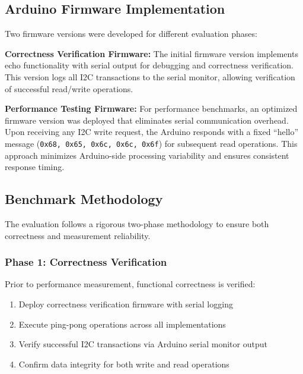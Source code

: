 
\subsection{Arduino Firmware Implementation}
\label{subsec:arduino-firmware}

Two firmware versions were developed for different evaluation phases:

\textbf{Correctness Verification Firmware:}
The initial firmware version implements echo functionality with serial output for debugging and correctness verification. This version logs all I2C transactions to the serial monitor, allowing verification of successful read/write operations.

\textbf{Performance Testing Firmware:}
For performance benchmarks, an optimized firmware version was deployed that eliminates serial communication overhead. Upon receiving any I2C write request, the Arduino responds with a fixed ``hello'' message (\texttt{0x68, 0x65, 0x6c, 0x6c, 0x6f}) for subsequent read operations. This approach minimizes Arduino-side processing variability and ensures consistent response timing.

\subsection{Benchmark Methodology}
\label{subsec:benchmark-methodology}

The evaluation follows a rigorous two-phase methodology to ensure both correctness and measurement reliability.

\subsubsection{Phase 1: Correctness Verification}
\label{subsubsec:correctness-verification}

Prior to performance measurement, functional correctness is verified:
\begin{enumerate}
    \item Deploy correctness verification firmware with serial logging
    \item Execute ping-pong operations across all implementations
    \item Verify successful I2C transactions via Arduino serial monitor output
    \item Confirm data integrity for both write and read operations
\end{enumerate}


